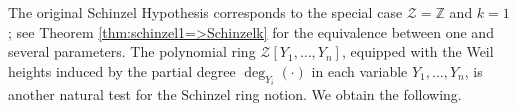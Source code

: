 \documentclass[11pt,a4paper,reqno]{amsart}
\newtheorem{thm}{Theorem}[section]
\theoremstyle{definition}
\newtheorem{defn}[thm]{Definition}
\begin{document}
{%



The original Schinzel Hypothesis corresponds to the special case ${\mathcal Z}={\mathbb Z}$ and $k=1$; see Theorem \ref{thm:schinzel1=>Schinzelk} for the equivalence between one and several parameters. The polynomial ring ${\mathcal Z}[Y_1,\ldots,Y_n]$, equipped with the Weil heights induced by the partial degree $\deg_{Y_i}(\cdot)$ in each variable $Y_1,\ldots,Y_n$, %
is another natural test for the Schinzel ring notion.
We obtain the following.

}
\end{document}
